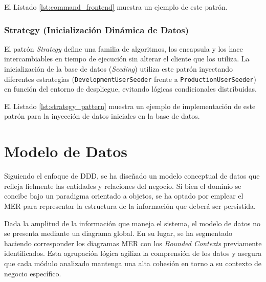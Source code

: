 El Listado \ref{lst:command_frontend} muestra un ejemplo de este patrón.

\subsubsection{Strategy (Inicialización Dinámica de Datos)}
El patrón \emph{Strategy} define una familia de algoritmos, los encapsula y los hace intercambiables en tiempo de ejecución sin alterar el cliente que los utiliza. La inicialización de la base de datos (\emph{Seeding}) utiliza este patrón inyectando diferentes estrategias (\texttt{DevelopmentUserSeeder} frente a \texttt{ProductionUserSeeder}) en función del entorno de despliegue, evitando lógicas condicionales distribuidas.

El Listado \ref{lst:strategy_pattern} muestra un ejemplo de implementación de este patrón para la inyección de datos iniciales en la base de datos.

\section{Modelo de Datos}
Siguiendo el enfoque de \ac{DDD}\cite{evans2004ddd}, se ha diseñado un modelo conceptual de datos que refleja fielmente las entidades y relaciones del negocio. Si bien el dominio se concibe bajo un paradigma orientado a objetos, se ha optado por emplear el \ac{MER}\cite{chen1976entity} para representar la estructura de la información que deberá ser persistida.

Dada la amplitud de la información que maneja el sistema, el modelo de datos no se presenta mediante un diagrama global. En su lugar, se ha segmentado haciendo corresponder los diagramas \ac{MER} con los \emph{Bounded Contexts} previamente identificados. Esta agrupación lógica agiliza la comprensión de los datos y asegura que cada módulo analizado mantenga una alta cohesión en torno a su contexto de negocio específico.

